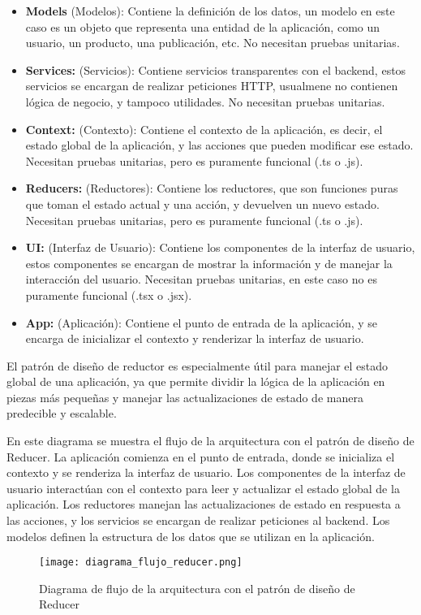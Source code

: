 \documentclass[executivepaper]{article}
\begin{document}
\begin{itemize}
  \item \textbf{Models} (Modelos): Contiene la definición de los datos, un modelo en este caso es un objeto que representa una entidad de la aplicación, como un usuario, un producto, una publicación, etc. No necesitan pruebas unitarias.
  \item \textbf{Services:} (Servicios): Contiene servicios transparentes con el backend, estos servicios se encargan de realizar peticiones HTTP, usualmene no contienen lógica de negocio, y tampoco utilidades. No necesitan pruebas unitarias.
  \item \textbf{Context:} (Contexto): Contiene el contexto de la aplicación, es decir, el estado global de la aplicación, y las acciones que pueden modificar ese estado. Necesitan pruebas unitarias, pero es puramente funcional (.ts o .js).
  \item \textbf{Reducers:} (Reductores): Contiene los reductores, que son funciones puras que toman el estado actual y una acción, y devuelven un nuevo estado. Necesitan pruebas unitarias, pero es puramente funcional (.ts o .js).
  \item \textbf{UI:} (Interfaz de Usuario): Contiene los componentes de la interfaz de usuario, estos componentes se encargan de mostrar la información y de manejar la interacción del usuario. Necesitan pruebas unitarias, en este caso no es puramente funcional (.tsx o .jsx).
  \item \textbf{App:} (Aplicación): Contiene el punto de entrada de la aplicación, y se encarga de inicializar el contexto y renderizar la interfaz de usuario.
\end{itemize}

El patrón de diseño de reductor es especialmente útil para manejar el estado global de una aplicación, ya que permite dividir la lógica de la aplicación en piezas más pequeñas y manejar las actualizaciones de estado de manera predecible y escalable.

En este diagrama se muestra el flujo de la arquitectura con el patrón de diseño de Reducer. La aplicación comienza en el punto de entrada, donde se inicializa el contexto y se renderiza la interfaz de usuario. Los componentes de la interfaz de usuario interactúan con el contexto para leer y actualizar el estado global de la aplicación. Los reductores manejan las actualizaciones de estado en respuesta a las acciones, y los servicios se encargan de realizar peticiones al backend. Los modelos definen la estructura de los datos que se utilizan en la aplicación.

\begin{figure}
  \begin{center}
    \texttt{[image: diagrama\_flujo\_reducer.png]}
    \caption{Diagrama de flujo de la arquitectura con el patrón de diseño de Reducer}
  \end{center}
\end{figure}
\end{document}
